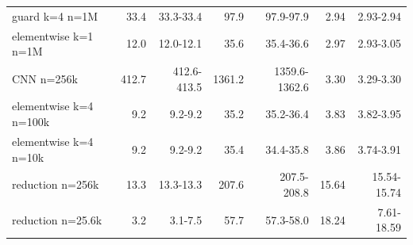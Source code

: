 \begin{tabular}{lrrrrrr}
guard k=4 n=1M & 33.4 & 33.3-33.4 & 97.9 & 97.9-97.9 & 2.94 & 2.93-2.94 \\
elementwise k=1 n=1M & 12.0 & 12.0-12.1 & 35.6 & 35.4-36.6 & 2.97 & 2.93-3.05 \\
CNN n=256k & 412.7 & 412.6-413.5 & 1361.2 & 1359.6-1362.6 & 3.30 & 3.29-3.30 \\
elementwise k=4 n=100k & 9.2 & 9.2-9.2 & 35.2 & 35.2-36.4 & 3.83 & 3.82-3.95 \\
elementwise k=4 n=10k & 9.2 & 9.2-9.2 & 35.4 & 34.4-35.8 & 3.86 & 3.74-3.91 \\
reduction n=256k & 13.3 & 13.3-13.3 & 207.6 & 207.5-208.8 & 15.64 & 15.54-15.74 \\
reduction n=25.6k & 3.2 & 3.1-7.5 & 57.7 & 57.3-58.0 & 18.24 & 7.61-18.59 \\
\bottomrule
\end{tabular}
